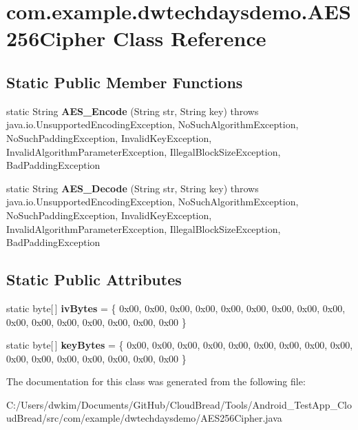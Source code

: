 \hypertarget{a00014}{}\section{com.\+example.\+dwtechdaysdemo.\+A\+E\+S256\+Cipher Class Reference}
\label{a00014}
\subsection*{Static Public Member Functions}
\begin{DoxyCompactItemize}
\item 
static String {\bfseries A\+E\+S\+\_\+\+Encode} (String str, String key)  throws java.\+io.\+Unsupported\+Encoding\+Exception, No\+Such\+Algorithm\+Exception, No\+Such\+Padding\+Exception, Invalid\+Key\+Exception, Invalid\+Algorithm\+Parameter\+Exception,	\+Illegal\+Block\+Size\+Exception, Bad\+Padding\+Exception \hypertarget{a00014_a97f7c104da946fe9b28e7bb68b5ba607}{}\label{a00014_a97f7c104da946fe9b28e7bb68b5ba607}

\item 
static String {\bfseries A\+E\+S\+\_\+\+Decode} (String str, String key)  throws java.\+io.\+Unsupported\+Encoding\+Exception, No\+Such\+Algorithm\+Exception, No\+Such\+Padding\+Exception, Invalid\+Key\+Exception, Invalid\+Algorithm\+Parameter\+Exception, Illegal\+Block\+Size\+Exception, Bad\+Padding\+Exception \hypertarget{a00014_a7a122dbded6e7fc850a069c4864336e1}{}\label{a00014_a7a122dbded6e7fc850a069c4864336e1}

\end{DoxyCompactItemize}
\subsection*{Static Public Attributes}
\begin{DoxyCompactItemize}
\item 
static byte\mbox{[}$\,$\mbox{]} {\bfseries iv\+Bytes} = \{ 0x00, 0x00, 0x00, 0x00, 0x00, 0x00, 0x00, 0x00, 0x00, 0x00, 0x00, 0x00, 0x00, 0x00, 0x00, 0x00 \}\hypertarget{a00014_a7851e04c17d2133f4c66b8ce11cad199}{}\label{a00014_a7851e04c17d2133f4c66b8ce11cad199}

\item 
static byte\mbox{[}$\,$\mbox{]} {\bfseries key\+Bytes} = \{ 0x00, 0x00, 0x00, 0x00, 0x00, 0x00, 0x00, 0x00, 0x00, 0x00, 0x00, 0x00, 0x00, 0x00, 0x00, 0x00 \}\hypertarget{a00014_a595598295e8b7294b71f528029b3c09f}{}\label{a00014_a595598295e8b7294b71f528029b3c09f}

\end{DoxyCompactItemize}


The documentation for this class was generated from the following file\+:\begin{DoxyCompactItemize}
\item 
C\+:/\+Users/dwkim/\+Documents/\+Git\+Hub/\+Cloud\+Bread/\+Tools/\+Android\+\_\+\+Test\+App\+\_\+\+Cloud\+Bread/src/com/example/dwtechdaysdemo/A\+E\+S256\+Cipher.\+java\end{DoxyCompactItemize}
